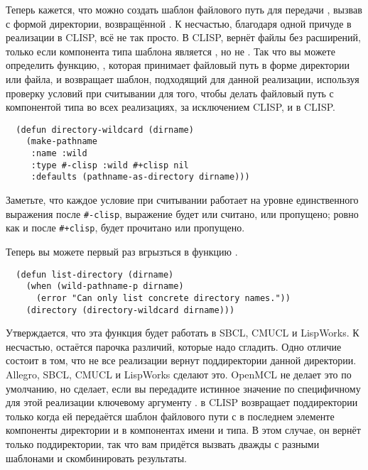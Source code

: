 Теперь кажется, что можно создать шаблон файлового путь для передачи ,
вызвав  с формой директории, возвращённой
. К несчастью, благодаря одной причуде в реализации
 в CLISP, всё не так просто. В CLISP,  вернёт файлы без
расширений, только если компонента типа шаблона является , но не
. Так что вы можете определить функцию, , которая
принимает файловый путь в форме директории или файла, и возвращает шаблон, подходящий для
данной реализации, используя проверку условий при считывании для того, чтобы делать
файловый путь с компонентой типа  во всех реализациях, за исключением CLISP, и
 в CLISP.

\begin{lstlisting}
  (defun directory-wildcard (dirname)
    (make-pathname
     :name :wild
     :type #-clisp :wild #+clisp nil
     :defaults (pathname-as-directory dirname)))
\end{lstlisting}

Заметьте, что каждое условие при считывании работает на уровне единственного выражения
после \lstinline!#-clisp!, выражение  будет или считано, или пропущено; ровно
как и после \lstinline!#+clisp!,  будет прочитано или пропущено.

Теперь вы можете первый раз вгрызться в функцию .

\begin{lstlisting}
  (defun list-directory (dirname)
    (when (wild-pathname-p dirname)
      (error "Can only list concrete directory names."))
    (directory (directory-wildcard dirname)))
\end{lstlisting}

Утверждается, что эта функция будет работать в SBCL, CMUCL и LispWorks. К несчастью,
остаётся парочка различий, которые надо сгладить. Одно отличие состоит в том, что не все
реализации вернут поддиректории данной директории. Allegro, SBCL, CMUCL и LispWorks
сделают это. OpenMCL не делает это по умолчанию, но сделает, если вы передадите
 истинное значение по специфичному для этой реализации ключевому аргументу
.  в CLISP возвращает поддиректории только когда ей
передаётся шаблон файлового пути с  в последнем элементе компоненты директории
и  в компонентах имени и типа. В этом случае, он вернёт только поддиректории,
так что вам придётся вызвать  дважды с разными шаблонами и скомбинировать
результаты.

